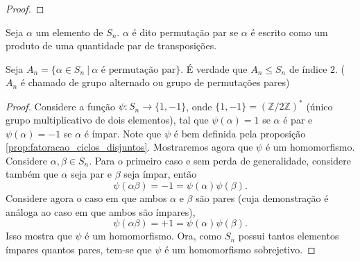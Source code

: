 \documentclass[11pt,openany]{book}
\begin{document}
\begin{proof}

\end{proof}

\begin{definition}
\label{def:permutacao_par}
    Seja $\alpha$ um elemento de $S_n$. $\alpha$ é dito permutação par se $\alpha$ é escrito como um produto de uma quantidade par de transposições.
\end{definition}
\begin{proposition}
\label{prop:}
    Seja $A_n = \{\alpha \in S_n \ | \ \text{$\alpha$ é permutação par}\}.$ É verdade que $A_n \leq S_n$ de índice $2$. ($A_n$ é chamado de grupo alternado ou grupo de permutações pares)
\end{proposition}

\begin{proof}
    Considere a função $\psi: S_n \rightarrow \{1, -1\}$, onde $\{1, -1\} = (\mathbb{Z}/2\mathbb{Z})^*$ (único grupo multiplicativo de dois elementos), tal que $\psi(\alpha) = 1$ se $\alpha$ é par e $\psi(\alpha) = -1$ se $\alpha$ é ímpar. Note que $\psi$ é bem definida pela proposição \ref{prop:fatoracao_ciclos_disjuntos}. Mostraremos agora que $\psi$ é um homomorfismo. Considere $\alpha, \beta \in S_n$. Para o primeiro caso e sem perda de generalidade, considere também que $\alpha$ seja par e $\beta$ seja ímpar, então
    \[\psi(\alpha \beta) =  -1 = \psi(\alpha) \psi(\beta).\]
    Considere agora o caso em que ambos $\alpha$ e $\beta$ são pares (cuja demonstração é análoga ao caso em que ambos são ímpares),
    \[\psi(\alpha \beta) = +1 = \psi(\alpha) \psi(\beta).\]
    Isso mostra que $\psi$ é um homomorfismo.
    Ora, como $S_n$ possui tantos elementos ímpares quantos pares, tem-se que $\psi$ é um homomorfismo sobrejetivo.
\end{proof}
\end{document}

